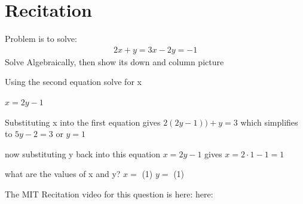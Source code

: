\documentclass{ximera}
\begin{document}
\section*{Recitation}

\begin{question}
Problem is to solve:
\begin{align*}
2x+y = 3
x-2y = -1
\end{align*}
Solve Algebraically, then show its down and column picture

\begin{solution}
\begin{hint}
	Using the second equation solve for x
\end{hint}
\begin{hint}
	$x=2y-1$
\end{hint}
\begin{hint}
	Substituting x into the first equation gives $2(2y-1))+y=3$ which simplifies to $5y-2=3$ or $y=1$
\end{hint}
\begin{hint}
	now substituting y back into this equation $x=2y-1$ gives $x=2\cdot1-1 = 1$
\end{hint}
what are the values of x and y? $x = $ \answer(1)  $y= $ \answer(1)
\end{solution}

\end{question}

The MIT Recitation video for this question is here:
here:
\end{document}
